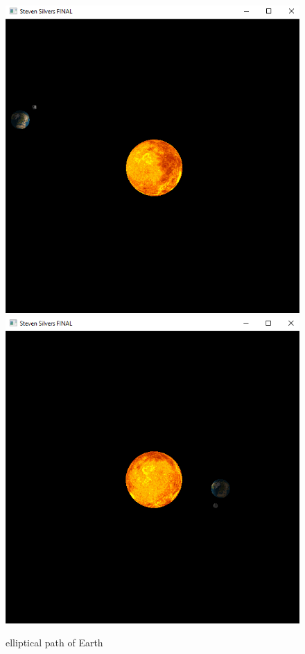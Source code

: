 \documentclass[12pt,serif,draftclsnofoot,onecolumn]{IEEEtran}
\begin{document}
	\begin{figure}[h]
		\includegraphics[scale=.5]{cap3}
		\includegraphics[scale=.5]{cap1}
		\caption{elliptical path of Earth}
	\end{figure}
\end{document}
